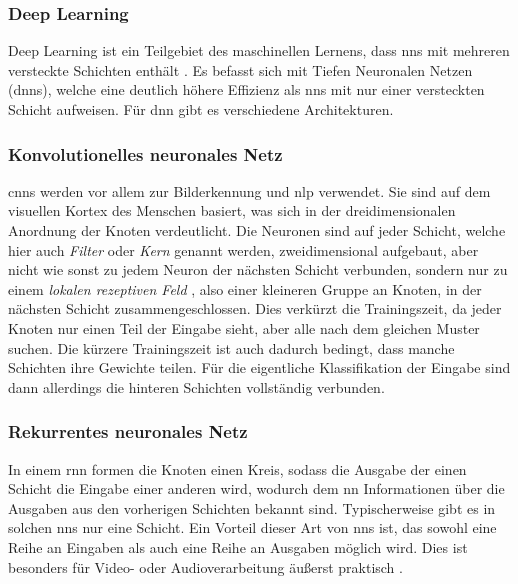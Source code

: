 \subsubsection{Deep Learning}

Deep Learning ist ein Teilgebiet des maschinellen Lernens, dass \acp{nn} mit mehreren versteckte Schichten enthält \citep{deeplearningreview}.
Es befasst sich mit Tiefen Neuronalen Netzen (\acp{dnn}), welche eine deutlich höhere Effizienz als \acp{nn} mit nur einer versteckten Schicht aufweisen.
Für \ac{dnn} gibt es verschiedene Architekturen.

\subsubsection{Konvolutionelles neuronales Netz}

\acp{cnn} werden vor allem zur Bilderkennung und \ac{nlp} verwendet.
Sie sind auf dem visuellen Kortex des Menschen basiert, was sich in der dreidimensionalen Anordnung der Knoten verdeutlicht.
Die Neuronen sind auf jeder Schicht, welche hier auch \emph{Filter} oder \emph{Kern} genannt werden,
zweidimensional aufgebaut, aber nicht wie sonst zu jedem Neuron der nächsten Schicht verbunden,
sondern nur zu einem \emph{lokalen rezeptiven Feld} \citep{deeplearningarchitecturesreview},
also einer kleineren Gruppe an Knoten, in der nächsten Schicht zusammengeschlossen.
Dies verkürzt die Trainingszeit, da jeder Knoten nur einen Teil der Eingabe sieht, aber alle nach dem gleichen Muster suchen.
Die kürzere Trainingszeit ist auch dadurch bedingt, dass manche Schichten ihre Gewichte teilen.
Für die eigentliche Klassifikation der Eingabe sind dann allerdings die hinteren Schichten vollständig verbunden.


\subsubsection{Rekurrentes neuronales Netz}

In einem \ac{rnn} formen die Knoten einen Kreis, sodass die Ausgabe der einen Schicht die Eingabe einer anderen wird,
wodurch dem \ac{nn} Informationen über die Ausgaben aus den vorherigen Schichten bekannt sind.
Typischerweise gibt es in solchen \acp{nn} nur eine Schicht.
Ein Vorteil dieser Art von \acp{nn} ist, das sowohl eine Reihe an Eingaben als auch eine Reihe an Ausgaben möglich wird.
Dies ist besonders für Video- oder Audioverarbeitung äußerst praktisch \citep{deeplearningarchitecturesreview}.

